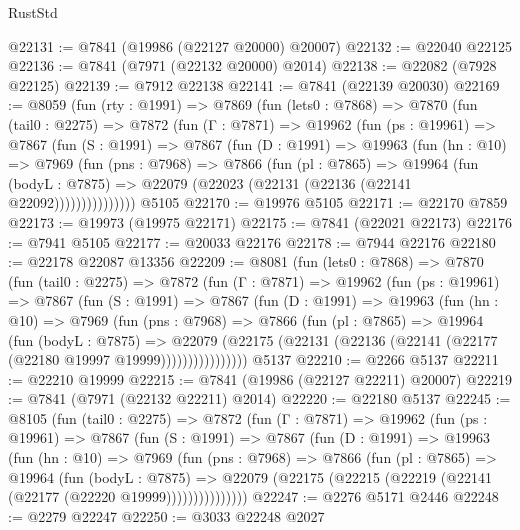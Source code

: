 \begin{lexlean}{RustStd}
\begin{coremodule}
{\begin{coremodule}
{{{{{{{{{{{{{{{{{{{{{{{{{{{{{{{{{{{{{{{{{{{{{{{{{{{{{{@22131 := @7841 (@19986 (@22127 @20000) @20007)
@22132 := @22040 @22125
@22136 := @7841 (@7971 (@22132 @20000) @2014)
@22138 := @22082 (@7928 @22125)
@22139 := @7912 @22138
@22141 := @7841 (@22139 @20030)
@22169 := @8059
    (fun (rty : @1991) =>
    @7869
      (fun (lets0 : @7868) =>
      @7870
        (fun (tail0 : @2275) =>
        @7872
          (fun (Γ : @7871) =>
          @19962
            (fun (ps : @19961) =>
            @7867
              (fun (S : @1991) =>
              @7867
                (fun (D : @1991) =>
                @19963
                  (fun (hn : @10) =>
                  @7969
                    (fun (pns : @7968) =>
                    @7866
                      (fun (pl : @7865) =>
                      @19964
                        (fun (bodyL : @7875) =>
                        @22079 (@22023 (@22131 (@22136 (@22141 @22092)))))))))))))))
    @5105
@22170 := @19976 @5105
@22171 := @22170 @7859
@22173 := @19973 (@19975 @22171)
@22175 := @7841 (@22021 @22173)
@22176 := @7941 @5105
@22177 := @20033 @22176
@22178 := @7944 @22176
@22180 := @22178 @22087 @13356
@22209 := @8081
    (fun (lets0 : @7868) =>
    @7870
      (fun (tail0 : @2275) =>
      @7872
        (fun (Γ : @7871) =>
        @19962
          (fun (ps : @19961) =>
          @7867
            (fun (S : @1991) =>
            @7867
              (fun (D : @1991) =>
              @19963
                (fun (hn : @10) =>
                @7969
                  (fun (pns : @7968) =>
                  @7866
                    (fun (pl : @7865) =>
                    @19964
                      (fun (bodyL : @7875) =>
                      @22079
                        (@22175
                          (@22131 (@22136 (@22141 (@22177 (@22180 @19997 @19999))))))))))))))))
    @5137
@22210 := @2266 @5137
@22211 := @22210 @19999
@22215 := @7841 (@19986 (@22127 @22211) @20007)
@22219 := @7841 (@7971 (@22132 @22211) @2014)
@22220 := @22180 @5137
@22245 := @8105
    (fun (tail0 : @2275) =>
    @7872
      (fun (Γ : @7871) =>
      @19962
        (fun (ps : @19961) =>
        @7867
          (fun (S : @1991) =>
          @7867
            (fun (D : @1991) =>
            @19963
              (fun (hn : @10) =>
              @7969
                (fun (pns : @7968) =>
                @7866
                  (fun (pl : @7865) =>
                  @19964
                    (fun (bodyL : @7875) =>
                    @22079 (@22175 (@22215 (@22219 (@22141 (@22177 (@22220 @19999)))))))))))))))
@22247 := @2276 @5171 @2446
@22248 := @2279 @22247
@22250 := @3033 @22248 @2027
}}}}}}}}}}}}}}}}}}}}}}}}}}}}}}}}}}}}}}}}}}}}}}}}}}}}}}
\end{coremodule}}
\end{coremodule}
\end{lexlean}
